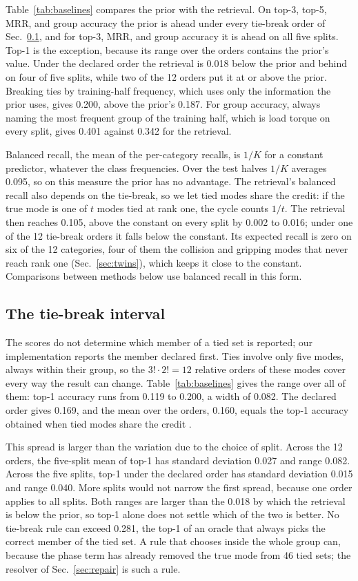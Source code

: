 \documentclass{ifacconf}
\begin{document}
Table~\ref{tab:baselines} compares the prior with the retrieval. On top-3,
top-5, MRR, and group accuracy the prior is ahead under every tie-break order of
Sec.~\ref{sec:tiebreak}, and for top-3, MRR, and group accuracy it is ahead on
all five splits. Top-1 is the exception, because its range over the orders
contains the prior's value. Under the declared order the retrieval is 0.018
below the prior and behind on four of five splits, while two of the 12 orders
put it at or above the prior. Breaking ties by training-half frequency, which
uses only the information the prior uses, gives 0.200, above the prior's 0.187.
For group accuracy, always naming the most frequent group of the training half,
which is load torque on every split, gives 0.401 against 0.342 for the
retrieval.

Balanced recall, the mean of the per-category recalls, is $1/K$ for a constant
predictor, whatever the class frequencies. Over the test halves $1/K$ averages
0.095, so on this measure the prior has no advantage. The retrieval's balanced
recall also depends on the tie-break, so we let tied modes share the credit: if
the true mode is one of $t$ modes tied at rank one, the cycle counts $1/t$. The
retrieval then reaches 0.105, above the constant on every split by 0.002 to
0.016; under one of the 12 tie-break orders it falls below the constant. Its
expected recall is zero on six of the 12 categories, four of them the collision
and gripping modes that never reach rank one (Sec.~\ref{sec:twins}), which keeps
it close to the constant.
Comparisons between methods below use balanced recall in this form.

\subsection{The tie-break interval}
\label{sec:tiebreak}

The scores do not determine which member of a tied set is reported; our
implementation reports the member declared first. Ties involve only five modes,
always within their group, so the $3!\cdot 2! = 12$ relative orders of these
modes cover every way the result can change. Table~\ref{tab:baselines} gives the
range over all of them: top-1 accuracy runs from 0.119 to 0.200, a width of
0.082. The declared order gives 0.169, and the mean over the orders, 0.160,
equals the top-1 accuracy obtained when tied modes share the credit
\citep{mcsherry}.

This spread is larger than the variation due to the choice of split. Across the
12 orders, the five-split mean of top-1 has standard deviation 0.027 and range
0.082. Across the five splits, top-1 under the declared order has standard
deviation 0.015 and range 0.040. More splits would not narrow the first spread,
because one order applies to all splits. Both ranges are larger than the 0.018
by which the retrieval is below the prior, so top-1 alone does not settle which
of the two is better. No tie-break rule can exceed 0.281, the top-1 of an oracle
that always picks the correct member of the tied set. A rule that chooses inside
the whole group can, because the phase term has already removed the true mode
from 46 tied sets; the resolver of Sec.~\ref{sec:repair} is such a rule.
\end{document}
